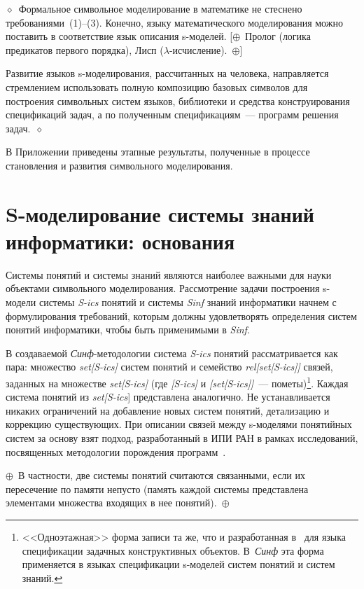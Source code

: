 \begin{multicols}{2}
\noindent
$\diamond$~Формальное символьное моделирование в математике не
стеснено требованиями~(1)--(3). Конечно, языку математического моделирования
можно поставить в соответствие язык описания s-моделей. [$\oplus$~Пролог
(логика предикатов первого порядка), Лисп ($\lambda$-исчисление).~$\oplus$]

Развитие языков s-моделирования, рассчитанных на человека, направляется
стремлением использовать полную композицию базовых символов для
построения символьных систем языков, биб\-лио\-те\-ки и средства
конструирования спецификаций задач, а по полученным спецификациям~---
программ решения задач.~$\diamond$

В Приложении приведены этапные результаты, полученные в процессе становления и
развития символьного моделирования.

\section{S-моделирование системы знаний информатики: основания } %

Системы понятий и системы знаний являются наиболее важными для науки объектами 
символьного моделирования. Рассмотрение задачи построения s-мо\-де\-ли системы 
\textit{S-ics} понятий и системы \textit{Sinf} знаний информатики начнем с 
формулирования требований, которым должны удовлетворять определения систем 
понятий информатики, чтобы быть применимыми в \textit{Sinf}.

В создаваемой \textit{Синф}-методологии система \textit{\mbox{S-ics}} понятий 
рассматривается как пара: множество \textit{set[S-ics]} систем понятий и 
семейство \textit{rel[set[S-ics]]} связей, заданных на множестве 
\textit{set[S-ics]} (где \textit{[\mbox{S-ics}]} и \textit{ [set[S-ics]]}~--- 
пометы)\footnote{<<Одноэтажная>> форма записи та же, что и разработанная 
в~\cite{7il} для языка спецификации задачных конструктивных объектов. 
В~\textit{Синф} эта форма применяется в языках спецификации s-моделей систем 
понятий и систем знаний.}. Каждая система понятий из \textit{set[S-ics}] 
представлена аналогично. Не устанавливается никаких ограничений на добавление 
новых систем понятий, детализацию и коррекцию существующих. При описании связей 
между s-моделями понятийных систем за основу взят подход, разработанный в ИПИ 
РАН в рамках исследований, посвященных методологии порождения 
программ~\cite{7il}.

\noindent
$\oplus$~В частности, две системы понятий считаются
связанными, если их пересечение по памяти непусто (память каждой системы пред\-став\-ле\-на
элементами множества входящих в нее понятий).~$\oplus$


\end{multicols}
